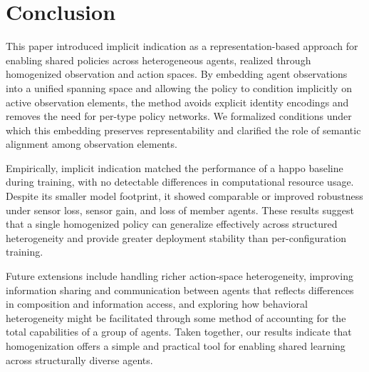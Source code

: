 \documentclass[]{jair}
\begin{document}
\section{Conclusion}
\label{con2:sec:conclusion}

This paper introduced implicit indication as a representation-based approach
for enabling shared policies across heterogeneous agents, realized through
homogenized observation and action spaces. By embedding agent observations into a unified
spanning space and allowing the policy to condition implicitly on active
observation elements, the method avoids explicit identity encodings and
removes the need for per-type policy networks. We formalized conditions
under which this embedding preserves representability and clarified the
role of semantic alignment among observation elements.

Empirically, implicit indication matched the performance of a
\gls{happo} baseline during training, with no detectable
differences in computational resource usage. 
Despite its smaller model footprint, it showed comparable 
or improved robustness under sensor loss, sensor gain,
and loss of member agents. These results suggest that a
single homogenized policy can generalize effectively across 
structured heterogeneity and provide greater deployment 
stability than per-configuration training.

Future extensions include handling richer action-space heterogeneity,
improving information sharing and communication between agents that
reflects differences in composition and information access,
and exploring how behavioral heterogeneity might be facilitated
through some method of accounting for the total capabilities of 
a group of agents. 
Taken together, our
results indicate that homogenization offers a simple and practical tool
for enabling shared learning across structurally diverse agents.






\printbibliography

\clearpage
\appendix
\end{document}
